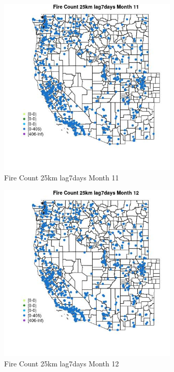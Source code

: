 \begin{figure} 
\centering  
\includegraphics[width=0.77\textwidth]{Code_Outputs/Report_ML_input_PM25_Step4_part_f_de_duplicated_aves_prioritize_24hr_obswNAs_MapObsMo11Fire_Count_25km_lag7days.jpg} 
\caption{\label{fig:Report_ML_input_PM25_Step4_part_f_de_duplicated_aves_prioritize_24hr_obswNAsMapObsMo11Fire_Count_25km_lag7days}Fire Count 25km lag7days Month 11} 
\end{figure} 
 

\clearpage 

\begin{figure} 
\centering  
\includegraphics[width=0.77\textwidth]{Code_Outputs/Report_ML_input_PM25_Step4_part_f_de_duplicated_aves_prioritize_24hr_obswNAs_MapObsMo12Fire_Count_25km_lag7days.jpg} 
\caption{\label{fig:Report_ML_input_PM25_Step4_part_f_de_duplicated_aves_prioritize_24hr_obswNAsMapObsMo12Fire_Count_25km_lag7days}Fire Count 25km lag7days Month 12} 
\end{figure} 
 

